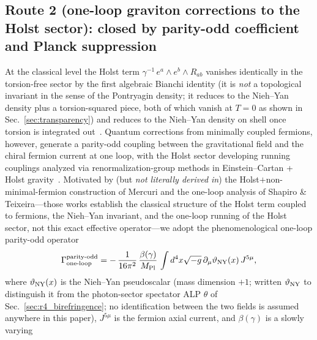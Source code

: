 \documentclass[aps,prd,twocolumn,superscriptaddress,showpacs,preprintnumbers,nofootinbib,longbibliography,floatfix]{revtex4-2}
\begin{document}
\subsection{Route 2 (one-loop graviton corrections to the Holst sector):
closed by parity-odd coefficient and Planck suppression}
\label{sec:r2_oneloop}
At the classical level the Holst term $\gamma^{-1}\,e^a\!\wedge e^b\wedge
R_{ab}$ vanishes identically in the torsion-free sector by the first
algebraic Bianchi identity (it is \emph{not} a topological invariant in the
sense of the Pontryagin density; it reduces to the Nieh--Yan density plus a
torsion-squared piece, both of which vanish at $T=0$ as shown in
Sec.~\ref{sec:transparency}) and reduces to the Nieh--Yan density on shell
once torsion is integrated out~\cite{Holst1996,Freidel2005}. Quantum
corrections from minimally coupled fermions, however, generate a
parity-odd coupling between the gravitational field and the chiral
fermion current at one loop, with the Holst sector developing
running couplings analyzed via renormalization-group methods in
Einstein--Cartan + Holst gravity~\cite{Mercuri2009,
ShapiroTeixeira2014}. Motivated by (but \emph{not literally
derived in}) the Holst$+$non-minimal-fermion construction of
Mercuri and the one-loop analysis of Shapiro \& Teixeira---those
works establish the classical structure of the Holst term coupled
to fermions, the Nieh--Yan invariant, and the one-loop running of
the Holst sector, not this exact effective operator---we adopt
the phenomenological one-loop parity-odd operator
\begin{equation}
\Gamma_{\rm one\text{-}loop}^{\rm parity\text{-}odd}
= -\,\frac{1}{16\pi^2}\,
\frac{\beta(\gamma)}{M_{\rm Pl}}\,
\int d^4x\sqrt{-g}\,
\partial_\mu\vartheta_{\rm NY}(x)\,J^{5\mu},
\label{eq:oneloop_parity_odd}
\end{equation}
where $\vartheta_{\rm NY}(x)$ is the Nieh--Yan pseudoscalar (mass dimension $+1$; written
$\vartheta_{\rm NY}$ to distinguish it from the photon-sector spectator
ALP $\theta$ of Sec.~\ref{sec:r4_birefringence}; no identification
between the two fields is assumed anywhere in this paper), $J^{5\mu}$
is the fermion axial current, and $\beta(\gamma)$ is a slowly varying
\end{document}
